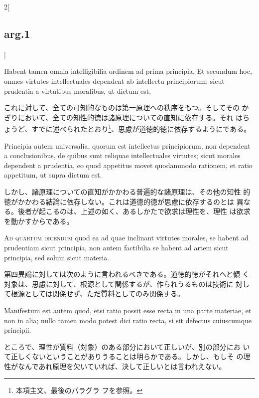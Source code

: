 \documentclass[paper=a4paper,fontsize=10pt,jafontsize=9pt,titlepage]{jlreq}
\begin{document}
\begin{paracol}{2}[\subsection{arg.1}]
\switchcolumn*

Habent tamen omnia intelligibilia ordinem ad prima principia. Et
secundum hoc, omnes virtutes intellectuales dependent ab intellectu
principiorum; sicut prudentia a virtutibus moralibus, ut dictum est.

\switchcolumn

これに対して、全ての可知的なものは第一原理への秩序をもつ。そしてその
 かぎりにおいて、全ての知性的徳は諸原理についての直知に依存する。それ
 はちょうど、すでに述べられたとおり\footnote{本項主文、最後のパラグラ
 フを参照。}、思慮が道徳的徳に依存するようにである。

\switchcolumn*

Principia autem universalia, quorum est intellectus principiorum, non
dependent a conclusionibus, de quibus sunt reliquae intellectuales
virtutes; sicut morales dependent a prudentia, eo quod appetitus movet
quodammodo rationem, et ratio appetitum, ut supra dictum est.

\switchcolumn

しかし、諸原理についての直知がかかわる普遍的な諸原理は、その他の知性
 的徳がかかわる結論に依存しない。これは道徳的徳が思慮に依存するのとは
 異なる。後者が起こるのは、上述の如く、あるしかたで欲求は理性を、理性
 は欲求を動かすからである。

\switchcolumn*[\subsection{ad.4}]

{\scshape Ad quartum dicendum} quod ea ad quae inclinant virtutes
morales, se habent ad prudentiam sicut principia, non autem factibilia
se habent ad artem sicut principia, sed solum sicut
 materia.

\switchcolumn

第四異論に対しては次のように言われるべきである。道徳的徳がそれへと傾
 く対象は、思慮に対して、根源として関係するが、作られうるものは技術に
 対して根源としては関係せず、ただ質料としてのみ関係する。

\switchcolumn*

Manifestum est autem quod, etsi ratio possit esse recta in una parte
materiae, et non in alia; nullo tamen modo potest dici ratio recta, si
sit defectus cuiuscumque principii.

\switchcolumn

ところで、理性が質料（対象）のある部分において正しいが、別の部分にお
 いて正しくないということがありうることは明らかである。しかし、もしそ
 の理性がなんであれ原理を欠いていれば、決して正しいとは言われえない。


\end{paracol}
\end{document}
